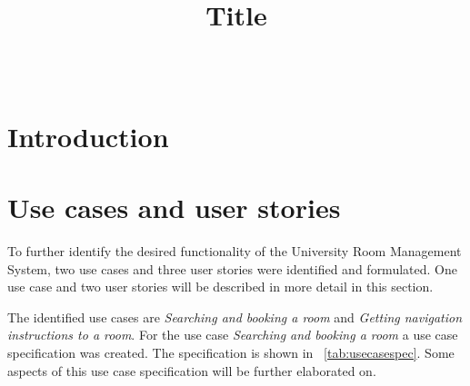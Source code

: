 \documentclass[conference,onecolumn]{IEEEtran}
\begin{document}
\title{Title\\} %

\author{\\ %

}

\maketitle
		

\begin{abstract}

\end{abstract}


\newpage
\tableofcontents

\newpage
\section{Introduction}

\section{Use cases and user stories}

To further identify the desired functionality of the University Room Management System, two use cases and three user stories were identified and formulated.
One use case and two user stories will be described in more detail in this section.

The identified use cases are \emph{Searching and booking a room} and \emph{Getting navigation instructions to a room}.
For the use case \emph{Searching and booking a room} a use case specification was created. The specification is shown in \tablename~\ref{tab:usecasespec}. Some aspects of this use case specification will be further elaborated on.
\end{document}

